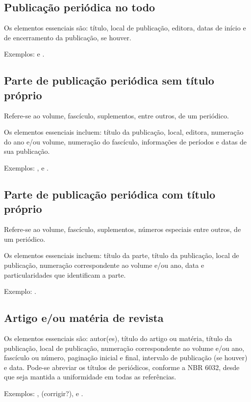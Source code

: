 \documentclass[monografia]{subfiles}
\begin{document}
	\subsection{Publicação periódica no todo}
	Os elementos essenciais são: título, local de publicação, editora,
datas de início e de encerramento da publicação, se houver.

	Exemplos: \cite{periodicotodo01} e \cite{periodicotodo02}.

	\subsection{Parte de publicação periódica sem título próprio}
Refere-se ao volume, fascículo, suplementos, entre outros, de um
periódico.

Os elementos essenciais incluem: título da publicação, local,
editora, numeração do ano e/ou volume, numeração do fascículo,
informações de períodos e datas de sua publicação.

	Exemplos: \cite{periodicopartentit01}, \cite{periodicopartentit02} e \cite{periodicopartentit03}.

	\subsection{Parte de publicação periódica com título próprio}
	Refere-se ao volume, fascículo, suplementos, números especiais
entre outros, de um periódico.

Os elementos essenciais incluem: título da parte, título da
publicação, local de publicação, numeração correspondente ao volume
e/ou ano, data e particularidades que identificam a parte.

	Exemplo: \cite{periodicopartetit01}.

	\subsection{Artigo e/ou matéria de revista}
	Os elementos essenciais são: autor(es), título do artigo ou matéria,
título da publicação, local de publicação, numeração correspondente ao
volume e/ou ano, fascículo ou número, paginação inicial e final,
intervalo de publicação (se houver) e data.
Pode-se abreviar os títulos de periódicos, conforme a NBR 6032,
desde que seja mantida a uniformidade em todas as referências.

	Exemplos: \cite{artigorevista01}, \cite{artigorevista02} (corrigir?), \cite{artigorevista03}
	e \cite{artigorevista04}.
\end{document}
